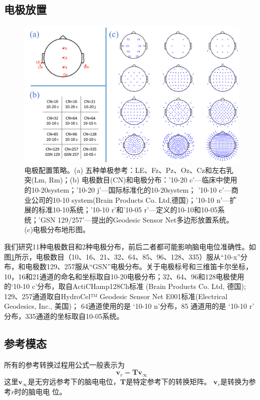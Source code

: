 \subsection{电极放置}
\begin{figure}[!ht]
	\centering
	\includegraphics[width=15cm]{pic/JNE/figure2.png}
	\caption{电极配置策略。(a) 五种单极参考：LE、Fz、Pz、Oz、Cz和左右乳突(Lm, Rm)；(b) 电极数目(CN)和电极分布：'10-20 c'—临床中使用的10-20system；'10-20 j'—国际标准化的10-20system； '10-10 c'—商业公司的10-10 system(Brain Products Co. Ltd,德国)；'10-10 n'—\cite{nuwer_m_r_ifcn_1998}扩展的标准10-10系统；'10-10 r'和'10-05 r'—\cite{oostenveld_r_and_praamstra_p_five_2001}定义的10-10和10-05系统；'GSN 129/257'—\cite{tucker_d_m_spatial_1993}提出的Geodesic Sensor Net多边形放置系统。(c)电极分布地形图。}
	\label{2:layout}
\end{figure}
我们研究11种电极数目和2种电极分布，前后二者都可能影响脑电电位准确性。如图\ref{2:layout}所示，电极数目（10、16、21、32、64、85、96、128、335）服从“10-x”分布，和电极数129、257服从“GSN”电极分布。关于电极标号和三维笛卡尔坐标，10，16和21通道的命名和坐标取自10-20电极分布；32、64、96和128电极使用的‘10-10 c’分布，取自ActiCHamp128Ch标准 (Brain Products Co. Ltd, 德国); 129、257通道取自HydroCel™ Geodesic Sensor Net E001标准(Electrical Geodesics, Inc., 美国)； 64通道使用的是 ‘10-10 n’分布，85
通道用的是 ‘10-10 r’ 分布，335通道的坐标取自10-05系统。
\subsection{参考模态}
所有的参考转换过程用公式一般表示为
\begin{equation}\label{eq2.3}
\mathbf{v}_r=\mathbf{Tv}_{\infty}
\end{equation}
这里$\mathbf{v}_{\infty}$是无穷远参考下的脑电电位，$\mathbf{T}$是特定参考下的转换矩阵。 $\mathbf{v}_r$是转换为参考$r$时的脑电电
位。
